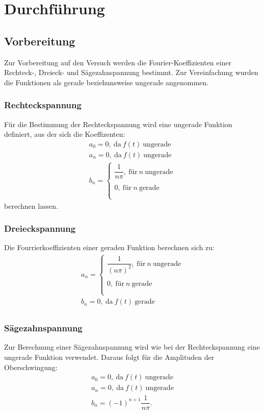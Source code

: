 

\section{Durchführung}
\subsection{Vorbereitung}
Zur Vorbereitung auf den Versuch werden die Fourier-Koeffizienten einer
Rechteck-, Dreieck- und Sägezahnspannung bestimmt. Zur Vereinfachung wurden die
Funktionen als gerade beziehunsweise ungerade angenommen.
\subsubsection{Rechteckspannung}
Für die Bestimmung der Rechteckspannung wird eine ungerade Funktion definiert, aus der sich
die Koeffizenten:
\begin{align*}
 a_{0} = 0,\ \text{da}\ f(t)\ \text{ungerade}\\
 a_{n} = 0,\ \text{da}\ f(t)\ \text{ungerade}\\
 b_{n} =	\begin{cases}
			\dfrac{1}{n\pi} ,\ \text{für}\ n\ \text{ungerade}\\ \\
      0 ,\ \text{für}\ n\ \text{gerade}\\\\
		\end{cases}
\end{align*}
berechnen lassen.

\subsubsection{Dreieckspannung}
Die Fourrierkoeffizienten einer geraden Funktion berechnen sich zu:
\begin{align*}
  a_{n} =  \begin{cases}
 					\dfrac{1}{(n\pi)^{2}} ,\ \text{für}\ n\ \text{ungerade}\\ \\
 					0 ,\ \text{für}\ n\ \text{gerade}\\\\
 				\end{cases}\\
  b_{n} = 0,\ \text{da}\ f(t)\ \text{gerade}\\
\end{align*}

\subsubsection{Sägezahnspannung}
Zur Berechnung einer Sägezahnspannung wird wie bei der Rechteckspannung eine
ungerade Funktion verwendet. Daraus folgt für die Amplituden der Oberschwingung:
\begin{align*}
 a_{0} = 0,\ \text{da}\ f(t)\ \text{ungerade}\\
 a_{n} = 0,\ \text{da}\ f(t)\ \text{ungerade}\\
 b_{n} = (-1)^{n+1} \dfrac{1}{n\pi}.
\end{align*}
